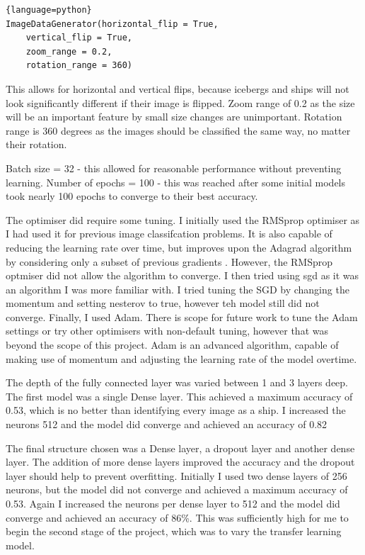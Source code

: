 \documentclass{article}
\begin{document}
\begin{lstlisting}{language=python}
ImageDataGenerator(horizontal_flip = True,
	vertical_flip = True,
	zoom_range = 0.2,
	rotation_range = 360)
\end{lstlisting}

This allows for horizontal and vertical flips, because icebergs and ships will not look significantly different if their image is flipped. Zoom range of 0.2 as the size will be an important feature by small size changes are unimportant. Rotation range is 360 degrees as the images should be classified the same way, no matter their rotation. 

Batch size = 32 - this allowed for reasonable performance without preventing learning. 
Number of epochs = 100 - this was reached after some initial models took nearly 100 epochs to converge to their best accuracy.

The optimiser did require some tuning. I initially used the RMSprop optimiser as I had used it for previous image classifcation problems. It is also capable of reducing the learning rate over time, but improves upon the Adagrad algorithm by considering only a subset of previous gradients \cite{ruder2016overview}. However, the RMSprop optmiser did not allow the algorithm to converge. I then tried using sgd as it was an algorithm I was more familiar with. I tried tuning the SGD by changing the momentum and setting nesterov to true, however teh model still did not converge. Finally, I used Adam. There is scope for future work to tune the Adam settings or try other optimisers with non-default tuning, however that was beyond the scope of this project. Adam is an advanced algorithm, capable of making use of momentum and adjusting the learning rate of the model overtime. \cite{ruder2016overview}

The depth of the fully connected layer was varied between 1 and 3 layers deep. The first model was a single Dense layer. This achieved a maximum accuracy of 0.53, which is no better than identifying every image as a ship. I increased the neurons  512 and the model did converge and achieved an accuracy of 0.82

The final structure chosen was a Dense layer, a dropout layer and another dense layer. The addition of more dense layers improved the accuracy and the dropout layer should help to prevent overfitting. Initially I used two dense layers of 256 neurons, but the model did not converge and achieved a maximum accuracy of 0.53. Again I increased the neurons per dense layer to 512 and the model did converge and achieved an accuracy of 86\%. This was sufficiently high for me to begin the second stage of the project, which was to vary the transfer learning model. 
\end{document}

